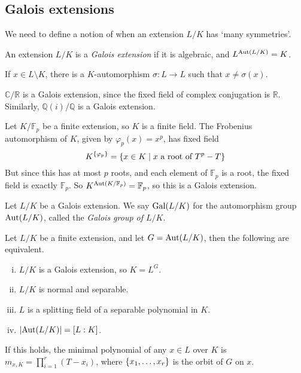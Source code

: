 \subsection{Galois extensions}
We need to define a notion of when an extension \( L / K \) has `many symmetries'.
\begin{definition}
	An extension \( L / K \) is a \emph{Galois extension} if it is algebraic, and \( L^{\operatorname{Aut}(L/K)} = K \).
\end{definition}
\begin{remark}
	If \( x \in L \setminus K \), there is a \( K \)-automorphism \( \sigma : L \to L \) such that \( x \neq \sigma(x) \).
\end{remark}
\begin{example}
	\( \mathbb C / \mathbb R \) is a Galois extension, since the fixed field of complex conjugation is \( \mathbb R \).
	Similarly, \( \mathbb Q(i) / \mathbb Q \) is a Galois extension.
\end{example}
\begin{example}
	Let \( K / \mathbb F_p \) be a finite extension, so \( K \) is a finite field.
	The Frobenius automorphism of \( K \), given by \( \varphi_p(x) = x^p \), has fixed field
	\[ K^{\qty{\varphi_p}} = \qty{x \in K \mid x \text{ a root of } T^p - T} \]
	But since this has at most \( p \) roots, and each element of \( \mathbb F_p \) is a root, the fixed field is exactly \( \mathbb F_p \).
	So \( K^{\operatorname{Aut}(K/\mathbb F_p)} = \mathbb F_p \), so this is a Galois extension.
\end{example}
\begin{definition}
	Let \( L / K \) be a Galois extension.
	We say \( \operatorname{Gal}(L/K) \) for the automorphism group \( \operatorname{Aut}(L/K) \), called the \emph{Galois group of \( L / K \)}.
\end{definition}
\begin{theorem}
	Let \( L / K \) be a finite extension, and let \( G = \operatorname{Aut}(L/K) \), then the following are equivalent.
	\begin{enumerate}[(i)]
		\item \( L / K \) is a Galois extension, so \( K = L^G \).
		\item \( L / K \) is normal and separable.
		\item \( L \) is a splitting field of a separable polynomial in \( K \).
		\item \( \abs{\operatorname{Aut}(L/K)} = [L : K] \).
	\end{enumerate}
	If this holds, the minimal polynomial of any \( x \in L \) over \( K \) is \( m_{x,K} = \prod_{i=1}^r (T - x_i) \), where \( \qty{x_1, \dots, x_r} \) is the orbit of \( G \) on \( x \).
\end{theorem}
